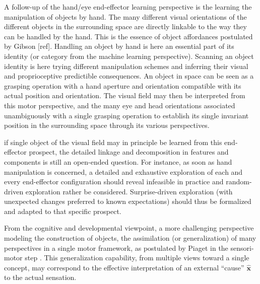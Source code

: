 \documentclass[11pt]{article}
\begin{document}
A follow-up of the hand/eye end-effector learning perspective is the learning the manipulation of objects by hand. The many different visual orientations of the different objects in the surrounding space are directly linkable to the way they can be handled by the hand. This is the essence of object affordances postulated by Gibson [ref]. Handling an object by hand is here an essential part of its identity (or category from the machine learning perspective). Scanning an object identity is here trying different manipulation schemes and inferring their visual and proprioceptive predictible consequences. An object in space can be seen as a grasping operation with a hand aperture and orientation compatible with its actual position and orientation. The visual field may then be interpreted from this motor perspective, and the many eye and head orientations associated unambiguously with a single grasping operation to establish its single invariant position in the surrounding space through its various perspectives. 

if single object of the visual field may in principle be learned from this end-effector prospect, the detailed linkage and decomposition in features and components is still an open-ended question. For instance, as soon as hand manipulation is concerned, a detailed and exhaustive exploration of each and every end-effector configuration should reveal infeasible in practice and random-driven exploration rather be considered. Surprise-driven exploration (with unexpected changes preferred to known expectations) should thus be formalized and adapted to that specific prospect.

From the cognitive and developmental viewpoint, a more challenging perspective modeling the construction of objects, the assimilation (or generalization) of many perspectives in a single motor framework, as postulated by Piaget in the sensori-motor step \cite{Piaget1973}. This generalization capability, from multiple views toward a single concept, may correspond to the effective interpretation of an external ``cause'' $\hat{\boldsymbol{x}}$ to the actual sensation.  




\end{document}
